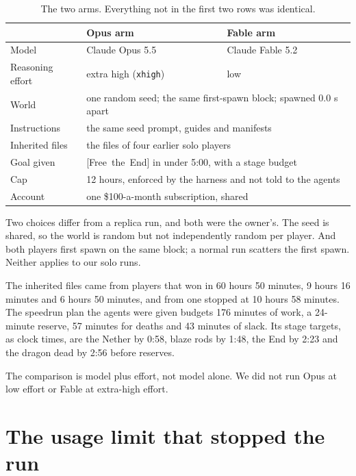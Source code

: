 \documentclass[11pt,a4paper]{article}
\newcommand{\adv}[1]{\mbox{\textsf{[#1]}}}
\begin{document}
\begin{table}[H]
\caption{The two arms. Everything not in the first two rows was identical.}
\label{tab:arms}
\begin{tabularx}{\textwidth}{@{}lXX@{}}
\toprule
 & Opus arm & Fable arm \\
\midrule
Model & Claude Opus 5.5 & Claude Fable 5.2 \\
Reasoning effort & extra high (\texttt{xhigh}) & low \\
World & \multicolumn{2}{l}{one random seed; the same first-spawn block; spawned 0.0 s apart} \\
Instructions & \multicolumn{2}{l}{the same seed prompt, guides and manifests} \\
Inherited files & \multicolumn{2}{l}{the files of four earlier solo players} \\
Goal given & \multicolumn{2}{l}{\adv{Free the End} in under 5:00, with a stage budget} \\
Cap & \multicolumn{2}{l}{12 hours, enforced by the harness and not told to the agents} \\
Account & \multicolumn{2}{l}{one \$100-a-month subscription, shared} \\
\bottomrule
\end{tabularx}
\end{table}

Two choices differ from a replica run, and both were the owner's. The seed is shared, so the world is random but not independently random per player. And both players first spawn on the same block; a normal run scatters the first spawn. Neither applies to our solo runs.

The inherited files came from players that won in 60 hours 50 minutes, 9 hours 16 minutes and 6 hours 50 minutes, and from one stopped at 10 hours 58 minutes. The speedrun plan the agents were given budgets 176 minutes of work, a 24-minute reserve, 57 minutes for deaths and 43 minutes of slack. Its stage targets, as clock times, are the Nether by 0:58, blaze rods by 1:48, the End by 2:23 and the dragon dead by 2:56 before reserves.

The comparison is model plus effort, not model alone. We did not run Opus at low effort or Fable at extra-high effort.

\section{The usage limit that stopped the run}
\label{sec:limit}
\end{document}
